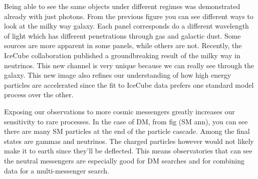 
Being able to see the same objects under different regimes was demonstrated already with just photons.
From the previous figure you can see different ways to look at the milky way galaxy.
Each panel corresponds do a different wavelength of light which has different penetrations through gas and galactic dust.
Some sources are more apparent in some panels, while others are not.
Recently, the IceCube collaboration published a groundbreaking result of the milky way in neutrinos.
This new channel is very unique because we can really see through the galaxy.
This new image also refines our understanding of how high energy particles are accelerated since the fit to IceCube data prefers one standard model process over the other.

Exposing our observations to more cosmic messengers greatly increases our sensitivity to rare processes.
In the case of DM, from fig (SM ann), you can see there are many SM particles at the end of the particle cascade.
Among the final states are gammas and neutrinos.
The charged particles however would not likely make it to earth since they'll be deflected.
This means observatories that can see the neutral messengers are especially good for DM searches and for combining data for a multi-messenger search.


